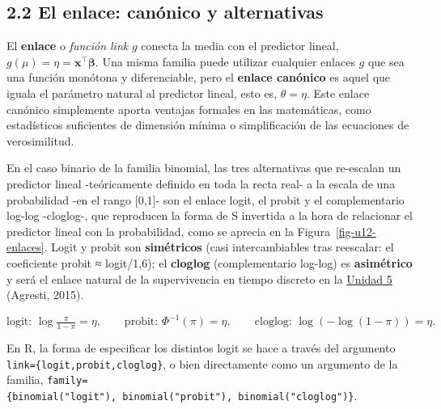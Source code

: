\documentclass[
  letterpaper,
  DIV=11,
  numbers=noendperiod]{scrartcl}
\begin{document}
\hypertarget{sec-u12-enlace}{%
\subsection{2.2 El enlace: canónico y
alternativas}\label{sec-u12-enlace}}

El \textbf{enlace} o \emph{función link} \(g\) conecta la media con el
predictor lineal, \(g(\mu)=\eta=\mathbf{x}^\top \boldsymbol\beta\). Una
misma familia puede utilizar cualquier enlaces \(g\) que sea una función
monótona y diferenciable, pero el \textbf{enlace canónico} es aquel que
iguala el parámetro natural al predictor lineal, esto es,
\(\theta=\eta\). Este enlace canónico simplemente aporta ventajas
formales en las matemáticas, como estadísticos suficientes de dimensión
mínima o simplificación de las ecuaciones de verosimilitud.

En el caso binario de la familia binomial, las tres alternativas que
re-escalan un predictor lineal -teóricamente definido en toda la recta
real- a la escala de una probabilidad -en el rango {[}0,1{]}- son el
enlace logit, el probit y el complementario log-log -cloglog-, que
reproducen la forma de S invertida a la hora de relacionar el predictor
lineal con la probabilidad, como se aprecia en la
Figura~\ref{fig-u12-enlaces}. Logit y probit son \textbf{simétricos}
(casi intercambiables tras reescalar: el coeficiente probit ≈
logit/1,6); el \textbf{cloglog} (complementario log-log) es
\textbf{asimétrico} y será el enlace natural de la supervivencia en
tiempo discreto en la \protect\hyperlink{sec-u15}{Unidad 5} (Agresti,
2015).

\[
\text{logit: }\log\tfrac{\pi}{1-\pi}=\eta,\qquad
\text{probit: }\Phi^{-1}(\pi)=\eta,\qquad
\text{cloglog: }\log(-\log(1-\pi))=\eta .
\]

\begin{tcolorbox}[enhanced jigsaw, breakable, colframe=quarto-callout-tip-color-frame, left=2mm, arc=.35mm, colbacktitle=quarto-callout-tip-color!10!white, toprule=.15mm, colback=white, coltitle=black, rightrule=.15mm, opacitybacktitle=0.6, title=\textcolor{quarto-callout-tip-color}{\faLightbulb}\hspace{0.5em}{🔧 En R. Especificar el enlace (logit, probit, cloglog)}, titlerule=0mm, toptitle=1mm, bottomtitle=1mm, leftrule=.75mm, bottomrule=.15mm, opacityback=0]

En R, la forma de especificar los distintos logit se hace a través del
argumento
\texttt{link=\{\textquotesingle{}logit\textquotesingle{},\textquotesingle{}probit\textquotesingle{},\textquotesingle{}cloglog\textquotesingle{}\}},
o bien directamente como un argumento de la familia,
\texttt{family=\{binomial("logit"),\ binomial("probit"),\ binomial("cloglog")\}}.

\end{tcolorbox}
\end{document}
